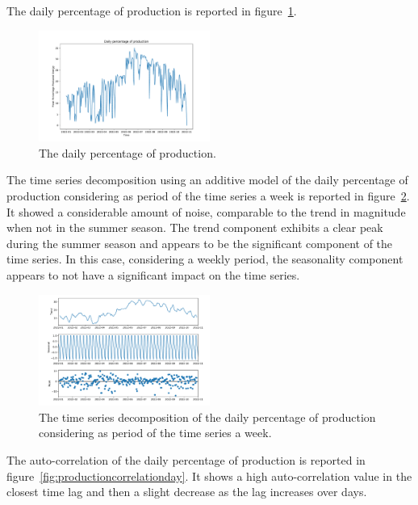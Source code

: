 The daily percentage of production is reported in figure~\ref{fig:productiondataplotday}.

\begin{figure}[H]
\centering
\includegraphics[width=0.5\textwidth]{images/production/data_day_aggregated_plot}
\caption{The daily percentage of production.}
\label{fig:productiondataplotday}
\end{figure}

The time series decomposition using an additive model of the daily percentage of production considering as period of the time series a week is reported in figure~\ref{fig:productiondecompositionday}.
It showed a considerable amount of noise, comparable to the trend in magnitude when not in the summer season.
The trend component exhibits a clear peak during the summer season and appears to be the significant component of the time series.
In this case, considering a weekly period, the seasonality component appears to not have a significant impact on the time series.

\begin{figure}[H]
\centering
\includegraphics[width=0.5\textwidth]{images/production/daily_aggregated_decomposition}
\caption{The time series decomposition of the daily percentage of production considering as period of the time series a week.}
\label{fig:productiondecompositionday}
\end{figure}

The auto-correlation of the daily percentage of production is reported in figure~\ref{fig:productioncorrelationday}.
It shows a high auto-correlation value in the closest time lag and then a slight decrease as the lag increases over days.

